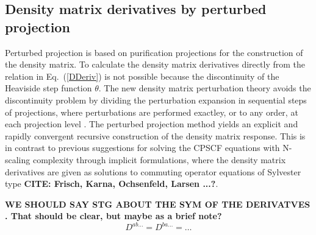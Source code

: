 \documentclass[prl,aps,twocolumn,showpacs,twocolumngrid,superbib]{revtex4}
\begin{document}
\subsection{Density matrix derivatives by perturbed projection}
Perturbed projection is based on purification projections for the 
construction of the density matrix. To calculate the
density matrix derivatives directly from the relation in Eq.\ (\ref{DDeriv})
is not possible because the discontinuity of the Heaviside step function $\theta$.
The new density matrix perturbation theory avoids the discontinuity problem
by dividing the perturbation expansion in sequential steps of projections,
where perturbations are performed exactley, or to any order, at each
projection level \cite{Niklasson04}. The perturbed projection method yields
an explicit and rapidly convergent recursive construction of
the density matrix response. This is in contrast to previous suggestions for
solving the CPSCF equations with N-scaling complexity through implicit
formulations, where the density matrix derivatives are given as solutions
to commuting operator equations of Sylvester type 
{\bf CITE: Frisch, Karna, Ochsenfeld, Larsen ...?}.


{\bf WE SHOULD SAY STG ABOUT THE SYM OF THE DERIVATVES}
{\bf . That should be clear, but maybe as a brief note?}
\begin{equation}
  D^{ab\ldots}=D^{ba\ldots}=\ldots
\end{equation}
\end{document}
